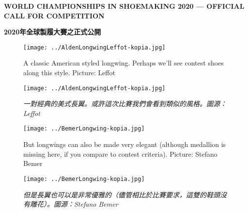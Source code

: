 \begin{paracol}{2}

    \setlength{\columnsep}{3.5em}
    \setlength{\columnseprule}{0.1pt}

    {\Large \textbf{WORLD CHAMPIONSHIPS IN SHOEMAKING 2020 --- OFFICIAL CALL FOR COMPETITION}}

    \vspace{1em}

    \switchcolumn
    {\Large \textbf{2020年全球製履大賽之正式公開}}
    \switchcolumn*

    \begin{figure}[h]
        \centering
        \texttt{[image: ../AldenLongwingLeffot-kopia.jpg]}
        \captionsetup{labelformat=empty}
        \caption{\tnr A classic American styled longwing. Perhaps we'll see contest shoes along this style. Picture: Leffot}
        \label{}
    \end{figure}

    \switchcolumn
    \begin{figure}[h]
        \centering
        \texttt{[image: ../AldenLongwingLeffot-kopia.jpg]}
        \captionsetup{labelformat=empty}
        \caption{\textit{一對經典的美式長翼。或許這次比賽我們會看到類似的風格。圖源：\textnormal{{\tnr Leffot}}}}
        \label{}
    \end{figure}
    \switchcolumn*

    \begin{figure}[h]
        \centering
        \texttt{[image: ../BemerLongwing-kopia.jpg]}
        \captionsetup{labelformat=empty}
        \caption{\tnr But longwings can also be made very elegant (although medallion is missing here, if you compare to contest criteria). Picture: Stefano Bemer}
        \label{}
    \end{figure}

    \switchcolumn
    \begin{figure}[h]
        \centering
        \texttt{[image: ../BemerLongwing-kopia.jpg]}
        \captionsetup{labelformat=empty}
        \caption{\textit{但是長翼也可以是非常優雅的（儘管相比於比賽要求，這雙的鞋頭沒有雕花）。圖源：\textnormal{{\tnr Stefano Bemer}}}}
        \label{}
    \end{figure}


\end{paracol}
